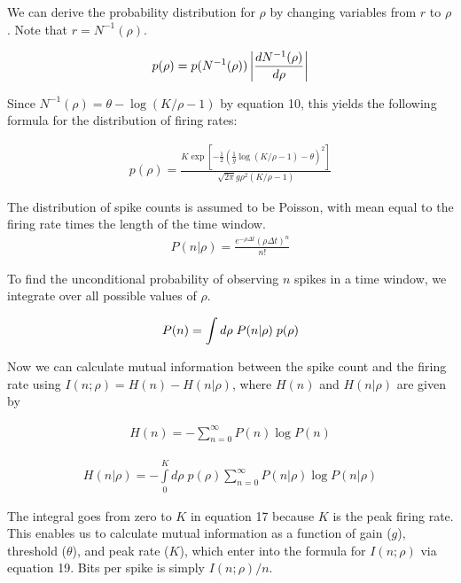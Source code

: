 \documentclass[12pt]{article}
\begin{document}
\noindent We can derive the probability distribution for $\rho$ by changing variables from $r$ to $\rho$. Note that $r=N^{-1}(\rho)$.

\begin{align}
\displaystyle p(\rho) = p(N^{-1}(\rho))\left | \frac{dN^{-1}(\rho)}{d\rho} \right | \notag
\end{align}

\noindent Since $\displaystyle N^{-1}(\rho)= \theta - \log(K/\rho-1)$ by equation 10, this yields the following formula for the distribution of firing rates:

\begin{align}
\displaystyle p(\rho) = \frac{K\exp\left[ -\frac{1}{2}\left( \frac{1}{g}\log(K/\rho-1)-\theta\right)^2\right]}{\sqrt{2\pi}g\rho^2(K/\rho-1)} \tag{19}
\end{align}

\noindent The distribution of spike counts is assumed to be Poisson, with mean equal to the firing rate times the length of the time window.
\begin{align}
\displaystyle P(n|\rho) = \frac{e^{-\rho\Delta t}(\rho \Delta t)^n}{n!} \tag{9}
\end{align}

\noindent To find the unconditional probability of observing $n$ spikes in a time window, we integrate over all possible values of $\rho$.

\begin{align}
\displaystyle P(n) =\int d\rho \; P(n|\rho) \; p(\rho) \notag
\end{align}

\noindent Now we can calculate mutual information between the spike count and the firing rate using $I(n;\rho)=H(n)-H(n|\rho)$, where $H(n)$ and $H(n|\rho)$ are given by

\begin{align}
\displaystyle H(n) = -\sum\limits_{n=0}^\infty P(n)\log P(n) \tag{16}
\end{align}

\begin{align}
\displaystyle H(n|\rho) = -\int\limits_0^K d\rho \; p(\rho) \sum\limits_{n=0}^\infty P(n|\rho) \log P(n|\rho) \tag{17}
\end{align}

\noindent The integral goes from zero to $K$ in equation 17 because $K$ is the peak firing rate. This enables us to calculate mutual information as a function of gain ($g$), threshold ($\theta$), and peak rate ($K$), which enter into the formula for $I(n;\rho)$ via equation 19. Bits per spike is simply $I(n;\rho)/n$.
\end{document}
